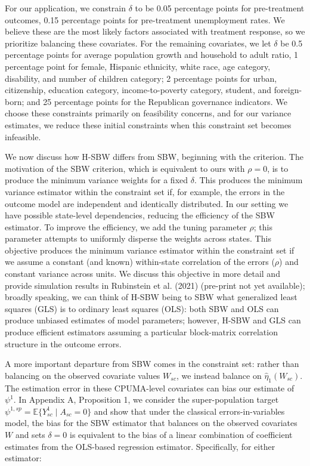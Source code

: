 \documentclass[aoas]{imsart}
\theoremstyle{plain}
\theoremstyle{remark}
\begin{document}
For our application, we constrain $\delta$ to be 0.05 percentage points for pre-treatment outcomes, 0.15 percentage points for pre-treatment unemployment rates. We believe these are the most likely factors associated with treatment response, so we prioritize balancing these covariates. For the remaining covariates, we let $\delta$ be 0.5 percentage points for average population growth and household to adult ratio, 1 percentage point for female, Hispanic ethnicity, white race, age category, disability, and number of children category; 2 percentage points for urban, citizenship, education category, income-to-poverty category, student, and foreign-born; and 25 percentage points for the Republican governance indicators. We choose these constraints primarily on feasibility concerns, and for our variance estimates, we reduce these initial constraints when this constraint set becomes infeasible.

We now discuss how H-SBW differs from SBW, beginning with the criterion. The motivation of the SBW criterion, which is equivalent to ours with $\rho = 0$, is to produce the minimum variance weights for a fixed $\delta$. This produces the minimum variance estimator within the constraint set if, for example, the errors in the outcome model are independent and identically distributed. In our setting we have possible state-level dependencies, reducing the efficiency of the SBW estimator. To improve the efficiency, we add the tuning parameter $\rho$; this parameter attempts to uniformly disperse the weights across states. This objective produces the minimum variance estimator within the constraint set if we assume a constant (and known) within-state correlation of the errors ($\rho$) and constant variance across units. We discuss this objective in more detail and provide simulation results in Rubinstein et al. (2021) (pre-print not yet available); broadly speaking, we can think of H-SBW being to SBW what generalized least squares (GLS) is to ordinary least squares (OLS): both SBW and OLS can produce unbiased estimates of model parameters; however, H-SBW and GLS can produce efficient estimators assuming a particular block-matrix correlation structure in the outcome errors. 

A more important departure from SBW comes in the constraint set: rather than balancing on the observed covariate values $W_{sc}$, we instead balance on $\hat{\eta}_1(W_{sc})$. The estimation error in these CPUMA-level covariates can bias our estimate of $\psi^1$. In Appendix A, Proposition 1, we consider the super-population target $\psi^{1, sp} = \mathbb{E}\{Y_{sc}^1 \mid A_{sc} = 0\}$ and show that under the classical errors-in-variables model, the bias for the SBW estimator that balances on the observed covariates $W$ and sets $\delta = 0$ is equivalent to the bias of a linear combination of coefficient estimates from the OLS-based regression estimator. Specifically, for either estimator:
\end{document}
